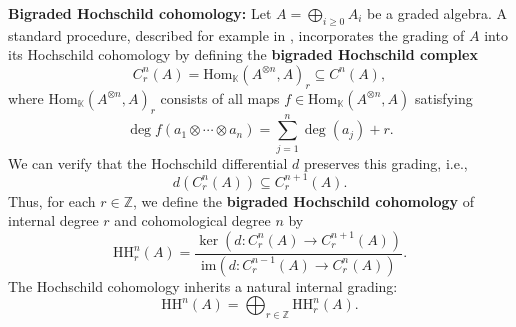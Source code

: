\documentclass{amsart}
\DeclareMathOperator{\Hom}{Hom}
\begin{document}
\begin{definition}
\textnormal{\textbf{Bigraded Hochschild cohomology:}
Let \( A = \bigoplus_{i \ge 0} A_i \) be a graded algebra. A standard procedure, described for example in \cite[Section 5.4]{Witherspoon2019HochschildCF}, incorporates the grading of \( A \) into its Hochschild cohomology by defining the \textbf{bigraded Hochschild complex}
\[
C_{r}^n(A) = \mathrm{Hom}_\mathbb{K}(A^{\otimes n}, A)_r \subseteq C^n(A),
\]
where \( \mathrm{Hom}_\mathbb{K}(A^{\otimes n}, A)_r \) consists of all maps \( f \in \mathrm{Hom}_\mathbb{K}(A^{\otimes n}, A) \) satisfying
\[
\deg f(a_1 \otimes \cdots \otimes a_n) = \sum_{j=1}^n \deg(a_j) + r.
\]
We can verify that the Hochschild differential \( d \) preserves this grading, i.e.,
\[
d(C_{r}^n(A)) \subseteq C_{r}^{n+1}(A).
\]
Thus, for each \( r \in \mathbb{Z} \), we define the \textbf{bigraded Hochschild cohomology} of internal degree \( r \) and cohomological degree \( n \) by
\[
\mathrm{HH}^{n}_r(A) = \frac{\ker(d : C_{r}^n(A) \to C_{r}^{n+1}(A))}{\mathrm{im}(d : C_{r}^{n-1}(A) \to C_{r}^n(A))}.
\]
The Hochschild cohomology inherits a natural internal grading:
\[
\mathrm{HH}^n(A) = \bigoplus_{r \in \mathbb{Z}} \mathrm{HH}_r^n(A).
\]}
\end{definition}




\end{document}
